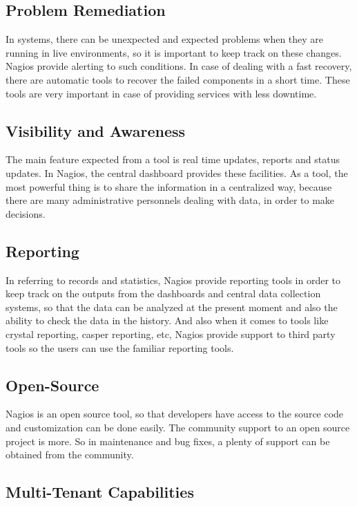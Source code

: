 \documentclass[9pt,twocolumn,twoside]{styles/osajnl}
\begin{document}
\subsection{Problem Remediation}

In systems, there can be unexpected and expected problems when they are running in live environments, so it is important to keep track on these changes. Nagios provide alerting to such conditions. In case of dealing with a fast recovery, there are automatic tools to recover the failed components in a short time. These tools are very important in case of providing services with less downtime.

\subsection{Visibility and Awareness}

The main feature expected from a tool is real time updates, reports and status updates. In Nagios, the central dashboard provides these facilities. As a tool, the most powerful thing is to share the information in a centralized way, because there are many administrative personnels dealing with data, in order to make decisions. 

\subsection{Reporting}

In referring to records and statistics, Nagios provide reporting tools in order to keep track on the outputs from the dashboards and central data collection systems, so that the data can be analyzed at the present moment and also the ability to check the data in the history. And also when it comes to tools like crystal reporting, casper reporting, etc, Nagios provide support to third party tools so the users can use the familiar reporting tools. 

\subsection{Open-Source}

Nagios is an open source tool, so that developers have access to the source code and customization can be done easily. The community support to an open source project is more. So in maintenance and bug fixes, a plenty of support can be obtained from the community.

\subsection{Multi-Tenant Capabilities}
\end{document}
